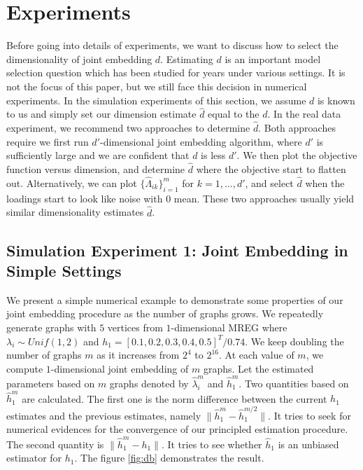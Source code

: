 \documentclass[10pt,journal,compsoc]{IEEEtran}
\begin{document}
\section{Experiments}
Before going into details of experiments, we want to discuss how to select the dimensionality of joint embedding $d$. Estimating $d$ is an important model selection question which has been studied for years under various settings. It is not the focus of this paper, but we still face this decision in numerical experiments. In the simulation experiments of this section, we assume $d$ is known to us and simply set our dimension estimate $\hat{d}$ equal to the $d$. In the real data experiment, we recommend two approaches to determine $\hat{d}$. Both approaches require we first run $d'$-dimensional joint embedding algorithm, where $d'$ is sufficiently large and we are confident that $d$ is less $d'$. We then plot the objective function versus dimension, and determine $\hat{d}$ where the objective start to flatten out. Alternatively, we can plot $\{\hat{\Lambda}_{ik}\}_{i=1}^m$ for $k=1,...,d'$, and select $\hat{d}$ when the loadings start to look like noise with $0$ mean. These two approaches usually yield similar dimensionality estimates $\hat{d}$. 

\subsection{Simulation Experiment 1: Joint Embedding in Simple Settings}
\noindent We present a simple numerical example to demonstrate some properties
of our joint embedding procedure as the number of graphs grows. We repeatedly generate graphs with $5$ vertices from $1$-dimensional MREG where $\lambda_i \sim Unif(1,2)$ and $h_1=[0.1,0.2,0.3,0.4,0.5]^T/0.74$. We keep doubling the number of graphs $m$ as it increases from $2^4$ to $2^{16}$. At each value of $m$, we compute $1$-dimensional joint embedding of $m$ graphs. Let the estimated parameters based on $m$ graphs denoted by $\hat{\lambda}_i^m$ and $\hat{h}_1^m$. Two quantities based on $\hat{h}_1^m$ are calculated. The first one is the norm difference between the current $h_1$ estimates and the previous estimates, namely $\|\hat{h}_1^m-\hat{h}_1^{m/2}\|$. It tries to seek for numerical evidences for the convergence of our principled estimation procedure. The second quantity is $\|\hat{h}^m_1-h_1\|$. It tries to see whether $\hat{h}_1$ is an unbiased estimator for $h_1$. The figure \ref{fig:db} demonstrates the result. \\
\end{document}
